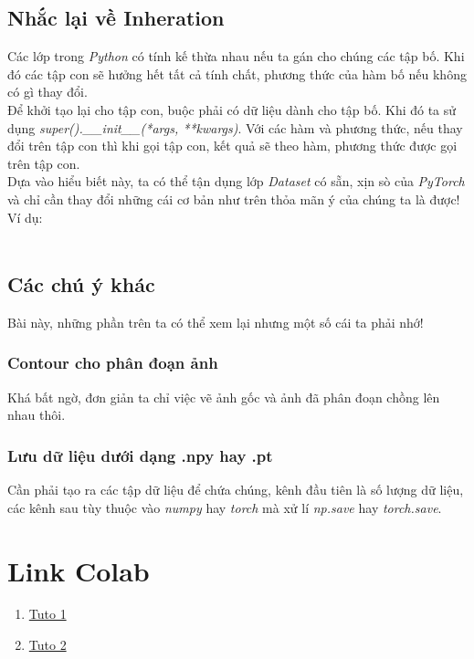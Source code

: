 \documentclass{article}
\begin{document}
    \subsection{Nhắc lại về Inheration}
    Các lớp trong \textit{Python} có tính kế thừa nhau nếu ta gán cho chúng các tập bố. Khi đó các tập con sẽ hưởng hết tất cả tính chất, phương thức của hàm bố nếu không có gì thay đổi.\\
    Để khởi tạo lại cho tập con, buộc phải có dữ liệu dành cho tập bố. Khi đó ta sử dụng \textit{super().\_\_init\_\_(*args, **kwargs)}. Với các hàm và phương thức, nếu thay đổi trên tập con thì khi gọi tập con, kết quả sẽ theo hàm, phương thức được gọi trên tập con.\\
    Dựa vào hiểu biết này, ta có thể tận dụng lớp \textit{Dataset} có sẵn, xịn sò của \textit{PyTorch} và chỉ cần thay đổi những cái cơ bản như trên thỏa mãn ý của chúng ta là được! Ví dụ: \\ \\
    \subsection{Các chú ý khác}
    Bài này, những phần trên ta có thể xem lại nhưng một số cái ta phải nhớ!
        \subsubsection{Contour cho phân đoạn ảnh}
        Khá bất ngờ, đơn giản ta chỉ việc vẽ ảnh gốc và ảnh đã phân đoạn chồng lên nhau thôi.
        \subsubsection{Lưu dữ liệu dưới dạng .npy hay .pt}
        Cần phải tạo ra các tập dữ liệu để chứa chúng, kênh đầu tiên là số lượng dữ liệu, các kênh sau tùy thuộc vào \textit{numpy} hay \textit{torch} mà xử lí \textit{np.save} hay \textit{torch.save}.

\section{Link Colab}
\begin{enumerate}
    \item \href{https://colab.research.google.com/drive/19XKrlUKfAlfoLetxb0pq1JdsFbd221no}{Tuto 1}
    \item \href{https://colab.research.google.com/drive/1qgijee2dDAFbMEP69cu3Pa8o07R7T9mR#scrollTo=NMXXL6CJ3pHv}{Tuto 2}
\end{enumerate}
\end{document}
